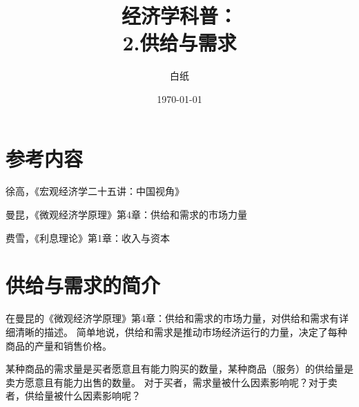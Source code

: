 \documentclass[UTF8]{article}
\title{经济学科普： \\ 2.供给与需求}
\author{白纸}
\date{\today}
\begin{document}
\maketitle

\section{参考内容}
    徐高，《宏观经济学二十五讲：中国视角》\par
    曼昆，《微观经济学原理》第4章：供给和需求的市场力量\par
    费雪，《利息理论》第1章：收入与资本

\section{供给与需求的简介}
    在曼昆的《微观经济学原理》第4章：供给和需求的市场力量，对供给和需求有详细清晰的描述。
    简单地说，供给和需求是推动市场经济运行的力量，决定了每种商品的产量和销售价格。\par
    某种商品的需求量是买者愿意且有能力购买的数量，某种商品（服务）的供给量是卖方愿意且有能力出售的数量。
    对于买者，需求量被什么因素影响呢？对于卖者，供给量被什么因素影响呢？
    
\end{document}
